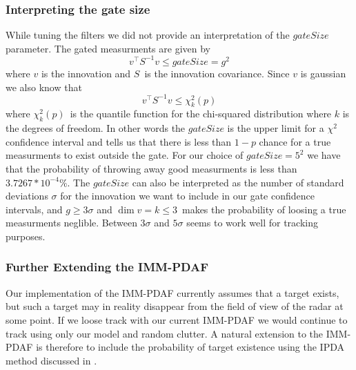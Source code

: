 \subsubsection{Interpreting the gate size} \label{sec:imm-pdaf-gate-size}
While tuning the filters we did not provide an interpretation of the $gateSize$ parameter. The gated measurments are given by 
$$v^\intercal S^{-1} v \leq gateSize = g^2$$ where $v$ is the innovation and $S$ is the innovation covariance.
Since $v$ is gaussian we also know that 
$$v^\intercal S^{-1} v \leq \chi_k^2(p)$$ where $\chi_k^2(p)$ is the quantile function for the chi-squared distribution where $k$ is the degrees of freedom\cite{wiki:multivariate_normal}. In other words the $gateSize$ is the upper limit for a $\chi^2$ confidence interval and tells us that there is less than $1-p$ chance for a true measurments to exist outside the gate. For our choice of $gateSize = 5^2$ we have that the probability of throwing away good measurments is less than $3.7267*10^{-4}\%$. The $gateSize$ can also be interpreted as the number of standard deviations $\sigma$ for the innovation we want to include in our gate confidence intervals, and  $g \geq 3\sigma$ and $\dim{v} = k \leq 3$ makes the probability of loosing a true measurments neglible.\cite{edmund} Between $3\sigma$ and $5\sigma$ seems to work well for tracking purposes.

\subsubsection{Further Extending the IMM-PDAF}
Our implementation of the IMM-PDAF currently assumes that a target exists, but such a target may in reality disappear from the field of view of the radar at some point. If we loose track with our current IMM-PDAF we would continue to track using only our model and random clutter. A natural extension to the IMM-PDAF is therefore to include the probability of target existence using the IPDA method discussed in \cite{imm-ipda}.
